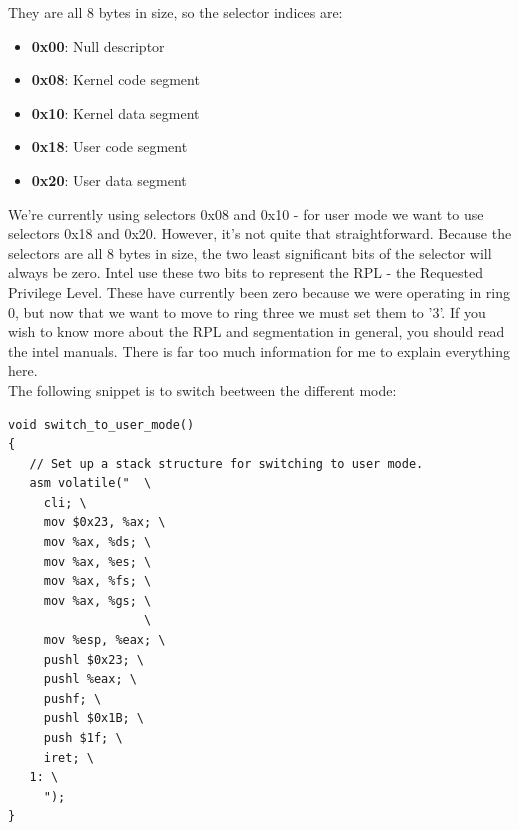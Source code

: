 \documentclass[12pt]{article}
\begin{document}
They are all 8 bytes in size, so the selector indices are:
\begin{itemize}
  \item \textbf{0x00}: Null descriptor
  \item \textbf{0x08}: Kernel code segment
  \item \textbf{0x10}: Kernel data segment
  \item \textbf{0x18}: User code segment
  \item \textbf{0x20}: User data segment
\end{itemize}
We're currently using selectors 0x08 and 0x10 - for user mode we want to use selectors 0x18 and 0x20. However, it's not quite that straightforward. Because the selectors are all 8 bytes in size, the two least significant bits of the selector will always be zero. Intel use these two bits to represent the RPL - the Requested Privilege Level. These have currently been zero because we were operating in ring 0, but now that we want to move to ring three we must set them to '3'. If you wish to know more about the RPL and segmentation in general, you should read the intel manuals. There is far too much information for me to explain everything here.\\

The following snippet is to switch beetween the different mode:
\begin{lstlisting}[style=CStyle]
void switch_to_user_mode()
{
   // Set up a stack structure for switching to user mode.
   asm volatile("  \
     cli; \
     mov $0x23, %ax; \
     mov %ax, %ds; \
     mov %ax, %es; \
     mov %ax, %fs; \
     mov %ax, %gs; \
                   \
     mov %esp, %eax; \
     pushl $0x23; \
     pushl %eax; \
     pushf; \
     pushl $0x1B; \
     push $1f; \
     iret; \
   1: \
     ");
}
\end{lstlisting}



\end{document}
